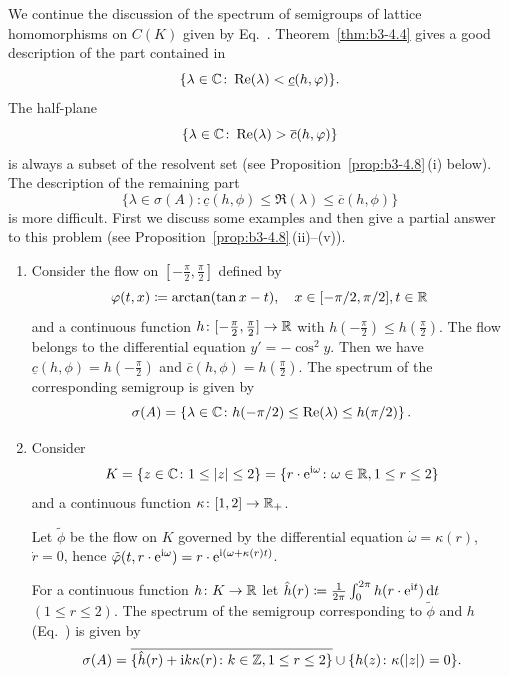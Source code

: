 We continue the discussion of the spectrum of semigroups of lattice homomorphisms on $C(K)$ given by Eq.~.
Theorem~\ref{thm:b3-4.4} gives a good description of the part contained in 
\[
\{\lambda \in \C \colon \Re(\lambda) < \underline{c}(h,\phi)\} .
\]
The half-plane 
\[
\{\lambda \in \C \colon \Re(\lambda) > \overline{c}(h,\phi)\}
\] 
is always a subset of the resolvent set (see Proposition~\ref{prop:b3-4.8}\,(i) below).
The description of the remaining part 
\[\{\lambda \in \sigma(A) \colon \underline{c}(h,\phi) \leq \Re(\lambda) \leq \overline{c}(h,\phi)\}
\]
is more difficult.
First we discuss some examples and then give a partial answer to this problem (see Proposition~\ref{prop:b3-4.8}\,(ii)--(v)).
\begin{example}\label{ex:b3-4.7}
	\begin{enumerate}[\upshape (i), wide, labelindent=.25em]
		\item 
		Consider the flow on $[-\frac{\pi}{2},\frac{\pi}{2}]$ defined by
		\[
		\phi(t,x)\coloneq \arctan(\tan x - t), \quad x \in [-{\pi}/{2},{\pi}/{2}], 
		t \in \R\
		\] 
		and a continuous function $h \colon [-\frac{\pi}{2},\frac{\pi}{2}] \to \mathbb{R}$ with $h(-\frac{\pi}{2}) \leq h(\frac{\pi}{2})$. The flow belongs to the differential equation $y' = -\cos^2y$. 
		Then we have $\underline{c}(h,\phi) = h(-\frac{\pi}{2})$ and $\overline{c}(h,\phi) = h(\frac{\pi}{2})$.
		The spectrum of the corresponding semigroup is given by 
		\[
		\sigma(A) = \left\{\lambda \in \C \colon h(-\pi/2) \leq \Re(\lambda) \leq h(\pi/2)\right\}.
		\]
		
		\item 
		Consider 
        \[
        K = \{z \in \C \colon 1 \leq |z| \leq 2\} = \{r\cdot \eu^{\im\omega} \colon \omega\in \R, 1 \leq r \leq 2\}
         \]
         and a continuous function $\kappa \colon [1,2] \to \mathbb{R}_+$.
		
		Let $\tilde{\phi}$ be the flow on $K$ governed by the differential equation $\dot{\omega} = \kappa(r)$, $\dot{r} = 0$, hence $\tilde{\phi}(t,r\cdot \eu^{\im\omega}) = r\cdot \eu^{\im(\omega + \kappa(r)t)}$.
		
		For a continuous function $h \colon K \to \mathbb{R}$ let $\hat{h}(r) \coloneq \frac{1}{2\pi}\int_{0}^{2\pi} h(r\cdot \mathrm{e}^{\mathrm{i} t}) \mathop{}\!\mathrm{d}{t}$ $(1 \leq r \leq 2)$.
		The spectrum of the semigroup corresponding to $\tilde{\phi}$ and $h$ (\cf Eq.~\myeqpageref{eq:b3-4.1}) is given by
		\[
		\sigma(A) = \overline{\{\hat{h}(r) +  \im k\kappa(r) \colon k \in \Z, 1 \leq r \leq 2\}} \cup \{h(z) \colon \kappa(|z|) = 0\}.
		\]
	\end{enumerate}
\end{example}
